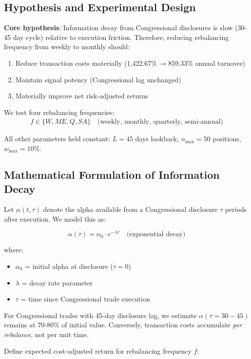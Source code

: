 \documentclass[twocolumn,ieee]{Base_Latex_Template/arithmaxresearch}
\begin{document}
\subsection{Hypothesis and Experimental Design}

\textbf{Core hypothesis}: Information decay from Congressional disclosures is slow (30-45 day cycle) relative to execution friction. Therefore, reducing rebalancing frequency from weekly to monthly should:
\begin{enumerate}
\item Reduce transaction costs materially (1,422.67\% → 859.33\% annual turnover)
\item Maintain signal potency (Congressional lag unchanged)
\item Materially improve net risk-adjusted returns
\end{enumerate}

We test four rebalancing frequencies:
\begin{align}
f \in \{W, ME, Q, SA\} \quad \text{(weekly, monthly, quarterly, semi-annual)}
\end{align}

All other parameters held constant: $L = 45$ days lookback, $n_{\max} = 50$ positions, $w_{\max} = 10\%$.

\subsection{Mathematical Formulation of Information Decay}

Let $\alpha(t, \tau)$ denote the alpha available from a Congressional disclosure $\tau$ periods after execution. We model this as:

$$\alpha(\tau) = \alpha_0 \cdot e^{-\lambda \tau} \quad \text{(exponential decay)}$$

where:
\begin{itemize}
\item $\alpha_0$ = initial alpha at disclosure ($\tau = 0$)
\item $\lambda$ = decay rate parameter
\item $\tau$ = time since Congressional trade execution
\end{itemize}

For Congressional trades with 45-day disclosure lag, we estimate $\alpha(\tau = 30-45)$ remains at 70-80\% of initial value. Conversely, transaction costs accumulate \textit{per rebalance}, not per unit time.

Define expected cost-adjusted return for rebalancing frequency $f$:
\end{document}

